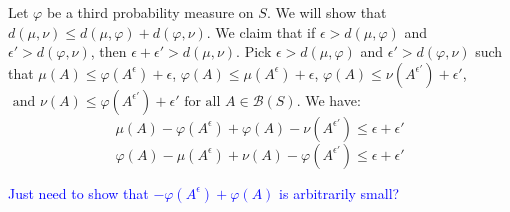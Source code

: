 \documentclass[hidelinks,11pt]{article}
\theoremstyle{definition}
\theoremstyle{dotless}
\theoremstyle{named}
\theoremstyle{remark}
\DeclareMathOperator{\1}{\mathbf{1}}
\begin{document}
Let $\varphi$ be a third probability measure on $S$. We will show that $d(\mu, \nu) \leq d(\mu, \varphi) + d(\varphi, \nu)$. We claim that if $\epsilon > d(\mu, \varphi)$ and $\epsilon' > d(\varphi, \nu)$, then $\epsilon + \epsilon' > d(\mu, \nu)$. Pick $\epsilon > d(\mu, \varphi)$ and $\epsilon' > d(\varphi, \nu)$ such that $\mu(A) \leq \varphi(A^\epsilon) + \epsilon$, $ \varphi(A) \leq \mu(A^\epsilon) + \epsilon$, $\varphi(A) \leq \nu(A^{\epsilon'}) + \epsilon'$, $ \text{ and } \nu(A) \leq \varphi(A^{\epsilon'}) + \epsilon' \text{ for all } A \in \mathcal{B}(S)$. We have: 
    \[\mu(A) - \varphi(A^\epsilon) + \varphi(A) - \nu(A^{\epsilon'}) \leq \epsilon + \epsilon'\]
    \[\varphi(A) - \mu(A^\epsilon) + \nu(A) - \varphi(A^{\epsilon'}) \leq \epsilon + \epsilon'\]

 \textcolor{blue}{Just need to show that $- \varphi(A^\epsilon) + \varphi(A)$ is arbitrarily small?}
\end{document}
